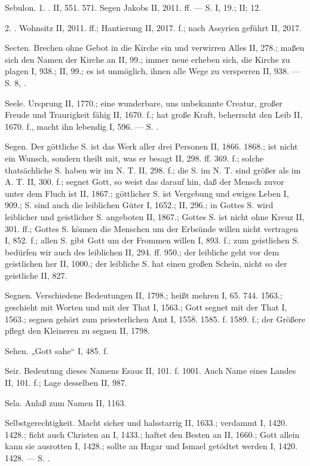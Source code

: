 Sebulon. 1. . II, 551. 571. Segen Jakobs II, 2011. ff. — S.  I, 19.; II;  12.

2. . Wohnsitz II, 2011. ff.; Hantierung II, 2017. f.; nach Assyrien geführt II, 2017.

Secten. Brechen ohne Gebot in die Kirche ein und verwirren Alles II, 278.; maßen sich den Namen der Kirche an II, 99.; immer neue erheben sich, die Kirche zu plagen I, 938.; II, 99.; es ist unmöglich, ihnen alle Wege zu versperren II, 938. — S.  8, .

Seele. Ursprung II, 1770.; eine wunderbare, uns unbekannte Creatur, großer Freude und Traurigkeit fähig II, 1670. f.; hat große Kraft, beherrscht den Leib II, 1670. f., macht ihn lebendig I, 596. — S. .

Segen. Der göttliche S. ist das Werk aller drei Personen II, 1866. 1868.; ist nicht ein Wunsch, sondern theilt mit, was er besagt II, 298. ff. 369. f.; solche thatsächliche S. haben wir im N. T. II, 298. f.; die S. im N. T. sind größer als im A. T. II, 300. f.; segnet Gott, so weist das darauf hin, daß der Mensch zuvor unter dem Fluch ist II, 1867.; göttlicher S. ist Vergebung und ewiges Leben I, 909.; S. sind auch die leiblichen Güter I, 1652.; II, 296.; in Gottes S. wird leiblicher und geistlicher S. angeboten II, 1867.; Gottes S. ist nicht ohne Kreuz II, 301. ff.; Gottes S. können die Menschen um der Erbsünde willen nicht vertragen I, 852. f.; allen S. gibt Gott um der Frommen willen I, 893. f.; zum geistlichen S. bedürfen wir auch des leiblichen II, 294. ff. 950.; der leibliche geht vor dem geistlichen her II, 1000.; der leibliche S. hat einen großen Schein, nicht so der geistliche II, 827.

Segnen. Verschiedene Bedeutungen II, 1798.; heißt mehren I, 65. 744. 1563.; geschieht mit Worten und mit der That I, 1563.; Gott segnet mit der That I, 1563.; segnen gehört zum priesterlichen Amt I, 1558. 1585. f. 1589. f.; der Größere pflegt den Kleineren zu segnen II, 1798.

Sehen. „Gott sahe“ I, 485. f.

Seir. Bedeutung dieses Namens Esaus II, 101. f. 1001. Auch Name eines Landes II, 101. f.; Lage desselben II, 987.

Sela. Anlaß zum Namen II, 1163.

Selbstgerechtigkeit. Macht sicher und halsstarrig II, 1633.; verdammt I, 1420. 1428.; ficht auch Christen an I, 1433.; haftet den Besten an II, 1660.; Gott allein kann sie ausrotten I, 1428.; sollte an Hagar und Ismael getödtet werden I, 1420. 1428. — S. .

